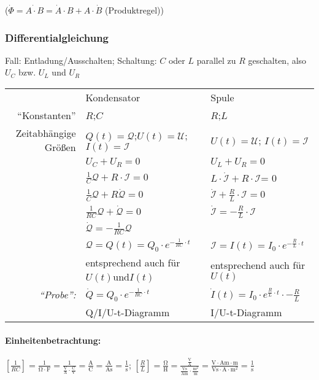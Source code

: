 \documentclass[a4paper]{scrartcl}
\begin{document}
(\(\dot{\Phi}=\dot{A \cdot B} = \dot{A} \cdot B + A \cdot \dot{B}\)
(Produktregel))

\subsubsection{Differentialgleichung}
Fall: Entladung/Ausschalten; Schaltung: \(C\) oder \(L\) parallel zu \(R\)
geschalten, also \(U_C\) bzw. \(U_L\) und \(U_R\)
\\ \begin{tabular}{rl|l}
& Kondensator						& Spule \\
"`Konstanten"'&\(R\);\(C\)			&\(R\);\(L\)\\
Zeitabhängige Größen &\(Q(t)=\mathcal{Q}\);\(U(t)=\mathcal{U}\);
	\(I(t)=\mathcal{I}\)				&\(U(t)=\mathcal{U}\);
	\(I(t)=\mathcal{I}\)\\
&\(U_C + U_R = 0\)&\(U_L + U_R = 0\)\\
&\(\frac{1}{C} \mathcal{Q} + R \cdot \mathcal{I} = 0\)&
	\(L \cdot \dot{\mathcal{I}} + R \cdot \mathcal{I}\)= 0 \\
&\(\frac{1}{C} \mathcal{Q} + R \dot{\mathcal{Q}} = 0\)&
	\(\dot{\mathcal{I}} + \frac{R}{L} \cdot \mathcal{I} = 0\)\\
&\(\frac{1}{RC} \mathcal{Q} + \dot{\mathcal{Q}} = 0\)&
	\(\dot{\mathcal{I}} = -\frac{R}{L} \cdot \mathcal{I}\)\\
&\(\dot{\mathcal{Q}} = - \frac{1}{RC} \mathcal{Q}\)& \\
\hline %
&\(\mathcal{Q} = Q(t) = Q_0 \cdot e^{-\frac{1}{RC} \cdot t}\)&
	\(\mathcal{I} = I(t) = I_0 \cdot e^{-\frac{R}{L} \cdot t}\)\\
& entsprechend auch für\(U(t)\)und\(I(t)\)& entsprechend auch für\(U(t)\)\\
\emph{"`Probe"':} &\(\dot{Q} = Q_0 \cdot e^{-\frac{1}{RC} \cdot t}\)&
	\(\dot{I}(t) = I_0 \cdot e^{\frac{R}{L} \cdot t} \cdot -\frac{R}{L}\)\\
& Q/I/U-t-Diagramm & I/U-t-Diagramm \\
\end{tabular}
\paragraph{Einheitenbetrachtung:} \([\frac{1}{RC}] = \mathrm{\frac{1}{\Omega
\cdot F} = \frac{1}{\frac{V}{A} \cdot \frac{C}{V}} = \frac{A}{C} = \frac{A}{As}
= \frac{1}{s}}\);
\([\frac{R}{L}] = \mathrm{\frac{\Omega}{H} = \frac{\frac{V}{A}}{\frac{Vs}{Am}
\cdot \frac{m^2}{m}} = \frac{V \cdot Am \cdot m}{Vs \cdot A \cdot m^2} =
\frac{1}{s}}\)
\end{document}
